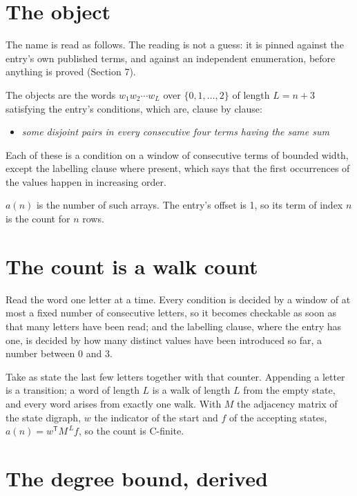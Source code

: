 \documentclass[11pt]{article}
\theoremstyle{definition}
\begin{document}
\section{The object}

The name is read as follows. The reading is not a guess: it is pinned against the entry's own published terms, and against an independent enumeration, before anything is proved (Section 7).

The objects are the words $w_1 w_2 \cdots w_L$ over $\{0,1,\dots,2\}$ of length $L = n + 3$ satisfying the entry's conditions, which are, clause by clause:

\begin{itemize}

\item {\itshape some disjoint pairs in every consecutive four terms having the same sum}

\end{itemize}

Each of these is a condition on a window of consecutive terms of bounded width, except the labelling clause where present, which says that the first occurrences of the values happen in increasing order.

$a(n)$ is the number of such arrays. The entry's offset is 1, so its term of index $n$ is the count for $n$ rows.

\section{The count is a walk count}

Read the word one letter at a time. Every condition is decided by a window of at most a fixed number of consecutive letters, so it becomes checkable as soon as that many letters have been read; and the labelling clause, where the entry has one, is decided by how many distinct values have been introduced so far, a number between $0$ and 3.

Take as state the last few letters together with that counter. Appending a letter is a transition; a word of length $L$ is a walk of length $L$ from the empty state, and every word arises from exactly one walk. With $M$ the adjacency matrix of the state digraph, $w$ the indicator of the start and $f$ of the accepting states, $a(n) = w^{\mathsf T}M^{\,L}f$, so the count is C-finite.

\section{The degree bound, derived}
\end{document}
